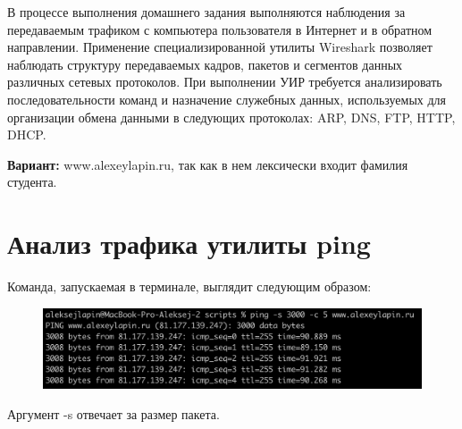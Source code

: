 \documentclass[12pt,onecolumn]{article}
\begin{document}
В процессе выполнения домашнего задания выполняются наблюдения за передаваемым трафиком с компьютера пользователя в Интернет и в обратном направлении. Применение специализированной утилиты Wireshark позволяет наблюдать структуру передаваемых кадров, пакетов и сегментов данных различных сетевых протоколов. При выполнении УИР требуется анализировать последовательности команд и назначение служебных данных, используемых для организации обмена данными в следующих протоколах: ARP, DNS, FTP, HTTP, DHCP.

\textbf{Вариант:} www.alexeylapin.ru, так как в нем лексически входит фамилия студента.
\section{Анализ трафика утилиты ping}
Команда, запускаемая в терминале, выглядит следующим образом:
\begin{figure}[H]
    \centering
    \includegraphics*[width=\textwidth]{image/part1/ping-cmd.png}
\end{figure}
Аргумент -s отвечает за размер пакета.
\end{document}
